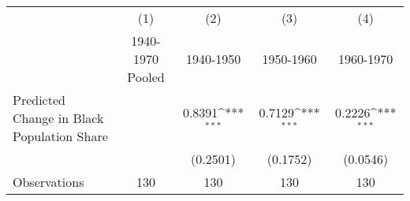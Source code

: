 {
\def\sym#1{\ifmmode^{#1}\else\(^{#1}\)\fi}
\begin{tabular}{l*{4}{c}}
\hline\hline
                    &\multicolumn{1}{c}{(1)}&\multicolumn{1}{c}{(2)}&\multicolumn{1}{c}{(3)}&\multicolumn{1}{c}{(4)}\\
                    &\multicolumn{1}{c}{1940-1970 Pooled}&\multicolumn{1}{c}{1940-1950}&\multicolumn{1}{c}{1950-1960}&\multicolumn{1}{c}{1960-1970}\\
\hline
Predicted Change in Black Population Share&                     &      0.8391\sym{***}&      0.7129\sym{***}&      0.2226\sym{***}\\
                    &                     &    (0.2501)         &    (0.1752)         &    (0.0546)         \\
\hline
Observations        &         130         &         130         &         130         &         130         \\
\hline\hline
\end{tabular}
}
